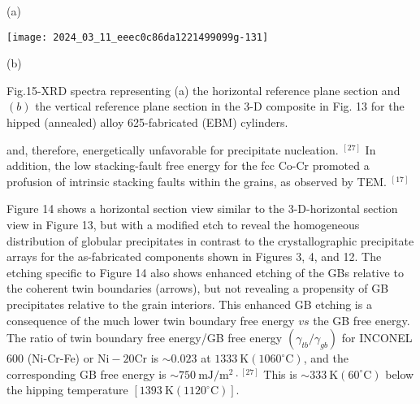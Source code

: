 \documentclass[10pt]{article}
\begin{document}
(a)

\begin{center}
\texttt{[image: 2024\_03\_11\_eeec0c86da1221499099g-131]}
\end{center}

(b)

Fig.15-XRD spectra representing (a) the horizontal reference plane section and $(b)$ the vertical reference plane section in the 3-D composite in Fig. 13 for the hipped (annealed) alloy 625-fabricated (EBM) cylinders.

and, therefore, energetically unfavorable for precipitate nucleation. ${ }^{[27]}$ In addition, the low stacking-fault free energy for the fcc Co-Cr promoted a profusion of intrinsic stacking faults within the grains, as observed by TEM. ${ }^{[17]}$

Figure 14 shows a horizontal section view similar to the 3-D-horizontal section view in Figure 13, but with a modified etch to reveal the homogeneous distribution of globular precipitates in contrast to the crystallographic precipitate arrays for the as-fabricated components shown in Figures 3, 4, and 12. The etching specific to Figure 14 also shows enhanced etching of the GBs relative to the coherent twin boundaries (arrows), but not revealing a propensity of GB precipitates relative to the grain interiors. This enhanced GB etching is a consequence of the much lower twin boundary free energy $v s$ the GB free energy. The ratio of twin boundary free energy/GB free energy $\left(\gamma_{t b} / \gamma_{g b}\right)$ for INCONEL 600 (Ni-Cr-Fe) or $\mathrm{Ni}-20 \mathrm{Cr}$ is $\sim 0.023$ at $1333 \mathrm{~K}\left(1060^{\circ} \mathrm{C}\right)$, and the corresponding GB free energy is $\sim 750 \mathrm{~mJ} / \mathrm{m}^{2} \cdot{ }^{[27]}$ This is $\sim 333 \mathrm{~K}\left(60^{\circ} \mathrm{C}\right)$ below the hipping temperature $\left[1393 \mathrm{~K}\left(1120^{\circ} \mathrm{C}\right)\right]$.
\end{document}
